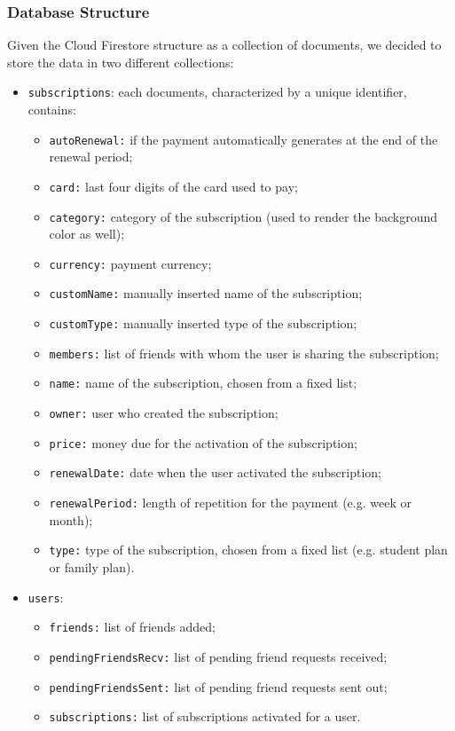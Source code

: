 \documentclass[11pt]{article}
\begin{document}
\subsubsection{Database Structure}
Given the Cloud Firestore structure as a collection of documents, we decided to store the data in two different collections: \begin{itemize}
    \item \texttt{subscriptions}: each documents, characterized by a unique identifier, contains: \begin{itemize}
              \item \texttt{autoRenewal:} if the payment automatically generates at the end of the renewal period;
              \item \texttt{card:} last four digits of the card used to pay;
              \item \texttt{category:} category of the subscription (used to render the background color as well);
              \item \texttt{currency:} payment currency;
              \item \texttt{customName:} manually inserted name of the subscription;
              \item \texttt{customType:} manually inserted type of the subscription;
              \item \texttt{members:} list of friends with whom the user is sharing the subscription;
              \item \texttt{name:} name of the subscription, chosen from a fixed list;
              \item \texttt{owner:} user who created the subscription;
              \item \texttt{price:} money due for the activation of the subscription;
              \item \texttt{renewalDate:} date when the user activated the subscription;
              \item \texttt{renewalPeriod:} length of repetition for the payment (e.g. week or month);
              \item \texttt{type:} type of the subscription, chosen from a fixed list (e.g. student plan or family plan).
          \end{itemize}
    \item \texttt{users}:  \begin{itemize}
              \item \texttt{friends:} list of friends added;
              \item \texttt{pendingFriendsRecv:} list of pending friend requests received;
              \item \texttt{pendingFriendsSent:} list of pending friend requests sent out;
              \item \texttt{subscriptions:} list of subscriptions activated for a user.
          \end{itemize}
\end{itemize}
\end{document}
